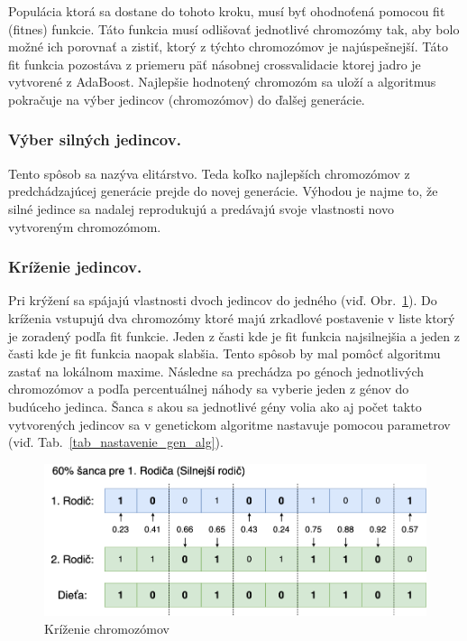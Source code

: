 \documentclass[runningheads]{llncs}
\begin{document}
Populácia ktorá sa dostane do tohoto kroku, musí byť ohodnoťená pomocou fit (fitnes) funkcie. 
Táto funkcia musí odlišovať jednotlivé chromozómy tak, aby bolo možné ich porovnať a zistiť, ktorý
z týchto chromozómov je najúspešnejší. Táto fit funkcia pozostáva z priemeru päť násobnej crossvalidacie ktorej jadro
je vytvorené z AdaBoost. Najlepšie hodnotený chromozóm sa uloží a algoritmus pokračuje
na výber jedincov (chromozómov) do ďalšej generácie.

\subsubsection{Výber silných jedincov.}

Tento spôsob sa nazýva elitárstvo. Teda koľko najlepších chromozómov z predchádzajúcej generácie prejde
do novej generácie. Výhodou je najme to, že silné jedince sa nadalej reprodukujú a predávajú svoje vlastnosti
novo vytvoreným chromozómom.

\subsubsection{Kríženie jedincov.}

Pri krýžení sa spájajú vlastnosti dvoch jedincov do jedného (viď. Obr.~\ref{fig_ga_krizenie}).
Do kríženia vstupujú dva chromozómy ktoré majú zrkadlové postavenie v liste ktorý je zoradený podľa fit funkcie. 
Jeden z časti kde je fit funkcia najsilnejšia a jeden z časti kde je fit funkcia naopak slabšia. 
Tento spôsob by mal pomôcť algoritmu zastať na lokálnom maxime. Následne sa prechádza po génoch 
jednotlivých chromozómov a podľa percentuálnej náhody sa vyberie jeden z génov do budúceho jedinca.
Šanca s akou sa jednotlivé gény volia ako aj počet takto vytvorených jedincov sa v genetickom algoritme
nastavuje pomocou parametrov (viď. Tab.~\ref{tab_nastavenie_gen_alg}). 

\begin{figure}
\includegraphics[width=\textwidth]{image/krizenie.png}
\caption{Kríženie chromozómov} \label{fig_ga_krizenie}
\end{figure}
\end{document}
